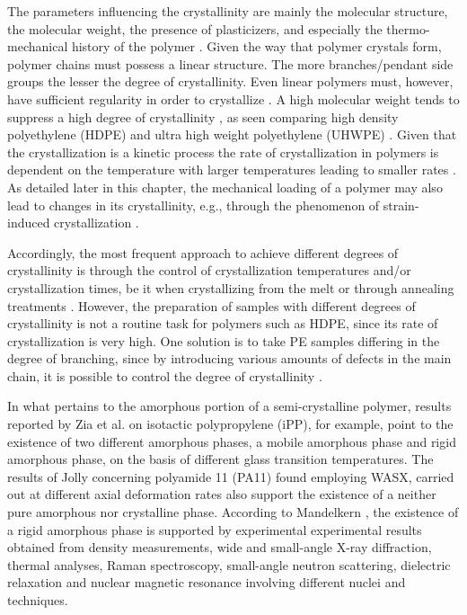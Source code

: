 The parameters influencing the crystallinity are mainly the molecular structure, the molecular weight, the presence of plasticizers, and especially the thermo-mechanical history of the polymer \citep{khouryMorphologyCrystallineSynthetic1976, cangemiTwoPhaseModelMechanical2001}.
Given the way that polymer crystals form, polymer chains must possess a linear structure.
The more branches/pendant side groups the lesser the degree of crystallinity.
Even linear polymers must, however, have sufficient regularity in order to crystallize \citep{khouryMorphologyCrystallineSynthetic1976}.
A high molecular weight tends to suppress a high degree of crystallinity \citep{hoffmanAnalysisRelaxationsPolychlorotrifluoroethylene2007}, as seen comparing high density polyethylene (HDPE) and ultra high weight polyethylene (UHWPE) \citep{brownInfluenceMolecularConformation2007}.
Given that the crystallization is a kinetic process the rate of crystallization in polymers is dependent on the temperature with larger temperatures leading to smaller rates \citep{callister2014materials}.
As detailed later in this chapter, the mechanical loading of a polymer may also lead to changes in its crystallinity, e.g., through the phenomenon of strain-induced crystallization \citep{raoStudyStraininducedCrystallization2001}.

Accordingly, the most frequent approach to achieve different degrees of crystallinity is through the control of crystallization temperatures and/or crystallization times, be it when crystallizing from the melt or through annealing treatments \citep{fakirovGlassTransitionTemperature2000, schrauwenIntrinsicDeformationBehavior2004}.
However, the preparation of samples with different degrees of crystallinity is not a routine task for polymers such as HDPE, since its rate of crystallization is very high.
One solution is to take PE samples differing in the degree of branching, since by introducing various amounts of defects in the main chain, it is possible to control the degree of crystallinity \citep{fakirovGlassTransitionTemperature2000}.

In what pertains to the amorphous portion of a semi-crystalline polymer, results reported by Zia et al. \citep{ziaRigidAmorphousFraction2008} on isotactic polypropylene (iPP), for example, point to the existence of two different amorphous phases, a mobile amorphous phase and rigid amorphous phase, on the basis of different glass transition temperatures.
The results of Jolly \citep{jollyAnalyseMicrostructurePolyamide2000} concerning polyamide 11 (PA11) found employing WASX, carried out at different axial deformation rates also support the existence of a neither pure amorphous nor crystalline phase.
According to Mandelkern \citep{mandelkernCrystallinePolymerReminiscences2006}, the existence of a rigid amorphous phase is supported by experimental experimental results obtained from density measurements, wide and small-angle X-ray diffraction, thermal analyses, Raman spectroscopy, small-angle neutron scattering, dielectric relaxation and nuclear magnetic resonance involving different nuclei and techniques.

